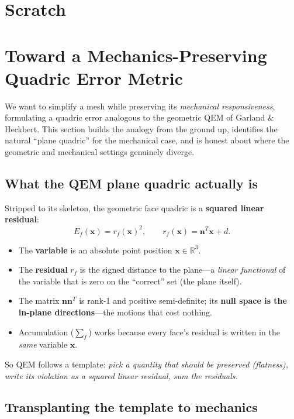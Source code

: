 \section{Scratch}

\section{Toward a Mechanics-Preserving Quadric Error Metric}

We want to simplify a mesh while preserving its \emph{mechanical responsiveness}, formulating a quadric error analogous to the geometric QEM of Garland \& Heckbert.
This section builds the analogy from the ground up, identifies the natural ``plane quadric'' for the mechanical case, and is honest about where the geometric and mechanical settings genuinely diverge.

\subsection{What the QEM plane quadric actually is}

Stripped to its skeleton, the geometric face quadric is a \textbf{squared linear residual}:
\begin{equation}
  E_f(\mathbf{x}) = r_f(\mathbf{x})^2, \qquad r_f(\mathbf{x}) = \mathbf{n}^T\mathbf{x} + d.
\end{equation}
\begin{itemize}
  \item The \textbf{variable} is an absolute point position $\mathbf{x}\in\mathbb{R}^3$.
  \item The \textbf{residual} $r_f$ is the signed distance to the plane---a \emph{linear functional} of the variable that is zero on the ``correct'' set (the plane itself).
  \item The matrix $\mathbf{n}\mathbf{n}^T$ is rank-1 and positive semi-definite; its \textbf{null space is the in-plane directions}---the motions that cost nothing.
  \item Accumulation ($\sum_f$) works because every face's residual is written in the \emph{same} variable $\mathbf{x}$.
\end{itemize}
So QEM follows a template: \emph{pick a quantity that should be preserved (flatness), write its violation as a squared linear residual, sum the residuals.}

\subsection{Transplanting the template to mechanics}

